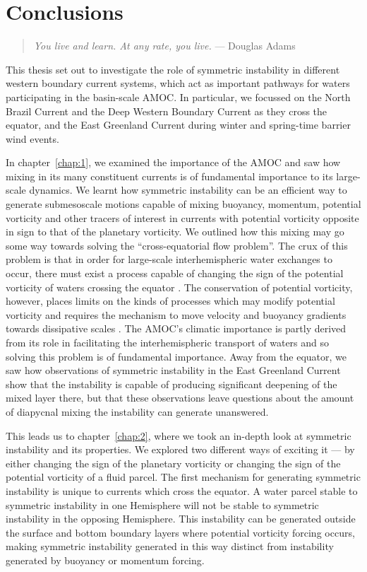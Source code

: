 \chapter{Conclusions}
\label{chap:Conclusions}
\begin{quote}
    \textit{You live and learn. At any rate, you live.} --- Douglas Adams
\end{quote}
This thesis set out to investigate the role of symmetric instability in different western boundary current systems, which act as important pathways for waters participating in the basin-scale AMOC. In particular, we focussed on the North Brazil Current and the Deep Western Boundary Current as they cross the equator, and the East Greenland Current during winter and spring-time barrier wind events.

In chapter~\ref{chap:1}, we examined the importance of the AMOC and saw how mixing in its many constituent currents is of fundamental importance to its large-scale dynamics. We learnt how symmetric instability can be an efficient way to generate submesoscale motions capable of mixing buoyancy, momentum, potential vorticity and other tracers of interest in currents with potential vorticity opposite in sign to that of the planetary vorticity. We outlined how this mixing may go some way towards solving the ``cross-equatorial flow problem''. The crux of this problem is that in order for large-scale interhemispheric water exchanges to occur, there must exist a process capable of changing the sign of the potential vorticity of waters crossing the equator \citep{Csanady1985, Nof1990, Killworth1991}. The conservation of potential vorticity, however, places limits on the kinds of processes which may modify potential vorticity and requires the mechanism to move velocity and buoyancy gradients towards dissipative scales \citep{Haynes1987}. The AMOC's climatic importance is partly derived from its role in facilitating the interhemispheric transport of waters and so solving this problem is of fundamental importance. Away from the equator, we saw how observations of symmetric instability in the East Greenland Current show that the instability is capable of producing significant deepening of the mixed layer there, but that these observations leave questions about the amount of diapycnal mixing the instability can generate unanswered.

This leads us to chapter~\ref{chap:2}, where we took an in-depth look at symmetric instability and its properties. We explored two different ways of exciting it --- by either changing the sign of the planetary vorticity or changing the sign of the potential vorticity of a fluid parcel. The first mechanism for generating symmetric instability is unique to currents which cross the equator. A water parcel stable to symmetric instability in one Hemisphere will not be stable to symmetric instability in the opposing Hemisphere. This instability can be generated outside the surface and bottom boundary layers where potential vorticity forcing occurs, making symmetric instability generated in this way distinct from instability generated by buoyancy or momentum forcing.

